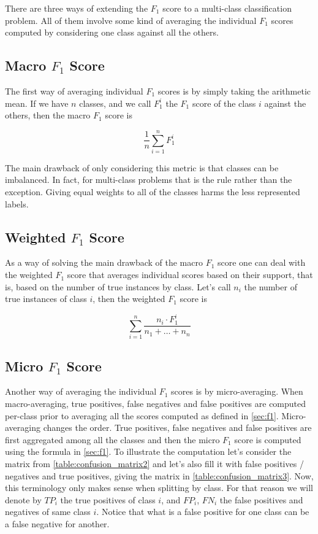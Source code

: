 There are three ways of extending the $F_1$ score to a multi-class classification problem. All of them involve some kind of averaging the individual $F_1$ scores computed by considering one class against all the others. 

\subsection{Macro $F_1$ Score}

The first way of averaging individual $F_1$ scores is by simply taking the arithmetic mean. If we have $n$ classes, and we call $F_1^i$ the $F_1$ score of the class $i$ against the others, then the macro $F_1$ score is

\begin{equation}
    \frac{1}{n} \sum_{i=1}^n F_1^i
\end{equation}

The main drawback of only considering this metric is that classes can be imbalanced. In fact, for multi-class problems that is the rule rather than the exception. Giving equal weights to all of the classes harms the less represented labels.

\subsection{Weighted $F_1$ Score}

As a way of solving the main drawback of the macro $F_1$ score one can deal with the weighted $F_1$ score that averages individual scores based on their support, that is, based on the number of true instances by class. Let's call $n_i$ the number of true instances of class $i$, then the weighted $F_1$ score is

\begin{equation}
    \sum_{i=1}^n \frac{n_i \cdot F_1^i}{n_1 + \dots + n_n}
\end{equation}

\subsection{Micro $F_1$ Score}\label{sec:micro}

Another way of averaging the individual $F_1$ scores is by micro-averaging. When macro-averaging, true positives, false negatives and false positives are computed per-class prior to averaging all the scores computed as defined in \autoref{sec:f1}. Micro-averaging changes the order. True positives, false negatives and false positives are first aggregated among all the classes and then the micro $F_1$ score is computed using the formula in \autoref{sec:f1}. To illustrate the computation let's consider the matrix from \autoref{table:confusion_matrix2} and let's also fill it with false positives / negatives and true positives, giving the matrix in \autoref{table:confusion_matrix3}. Now, this terminology only makes sense when splitting by class. For that reason we will denote by $TP_i$ the true positives of class $i$, and $FP_i$, $FN_i$ the false positives and negatives of same class $i$. Notice that what is a false positive for one class can be a false negative for another.

